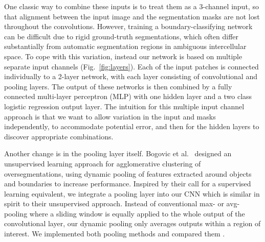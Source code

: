 One classic way to combine these inputs is to treat them as a 3-channel input, so that alignment between the input image and the segmentation masks are not lost throughout the convolutions. However, training a boundary-classifying network can be difficult due to rigid ground-truth segmentations, which often differ substantially from automatic segmentation regions in ambiguous intercellular space. To cope with this variation, instead our network is based on multiple separate input channels (Fig.~\ref{fig:layers}). Each of the input patches is connected individually to a 2-layer network, with each layer consisting of convolutional and pooling layers. The output of these networks is then combined by a fully connected multi-layer perceptron (MLP) with one hidden layer and a two class logistic regression output layer. The intuition for this multiple input channel approach is that we want to allow variation in the input and masks independently, to accommodate potential error, and then for the hidden layers to discover appropriate combinations.

Another change is in the pooling layer itself. Bogovic et al.~\cite{BogovicHJ13} designed an unsupervised learning approach for agglomerative clustering of oversegmentations, using dynamic pooling of features extracted around objects and boundaries to increase performance. Inspired by their call for a supervised learning equivalent, we integrate a pooling layer into our CNN which is similar in spirit to their unsupervised approach. Instead of conventional max- or avg-pooling where a sliding window is equally applied to the whole output of the convolutional layer, our dynamic pooling only averages outputs within a region of interest. We implemented both pooling methods and compared them .

